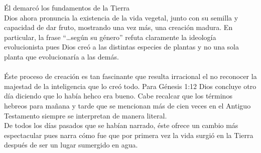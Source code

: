 \begin{section}{Él demarcó los fundamentos de la Tierra}
\\
Dios ahora pronuncia la existencia de la vida vegetal, junto con su semilla y capacidad de dar fruto, mostrando una vez más, una creación madura. En particular, la frase ``\ldots según su género'' refuta claramente la ideología evolucionista pues Dios creó a las distintas especies de plantas y no una sola planta que evolucionaría a las demás.\\
\\
Éste proceso de creación es tan fascinante que resulta irracional el no reconocer la majestad de la inteligencia que lo creó todo.
\newpage
Para Génesis 1:12 Dios concluye otro día diciendo que lo había hehco era bueno. Cabe recalcar que los términos hebreos para mañana y tarde que se mencionan más de cien veces en el Antiguo Testamento siempre se interpretan de manera literal.\\
De todos los días pasados que se habían narrado, éste ofrece un cambio más espectacular pues narra cómo fue que por primera vez la vida surgió en la Tierra después de ser un lugar sumergido en agua.
\end{section}
\newpage
